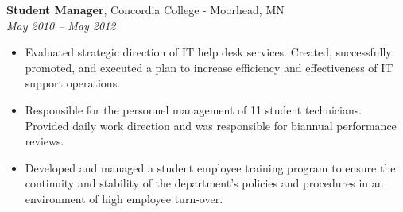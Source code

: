 {\bf Student Manager}, Concordia College - Moorhead, MN\\
{\it May 2010 – May 2012}
\begin{itemize}
	\item Evaluated strategic direction of IT help desk services.  Created, successfully promoted, and executed a plan to increase efficiency and effectiveness of IT support operations.
	\item Responsible for the personnel management of 11 student technicians.  Provided daily work direction and was responsible for biannual performance reviews.
	\item Developed and managed a student employee training program to ensure the continuity and stability of the department’s policies and procedures in an environment of high employee turn-over.
\end{itemize}